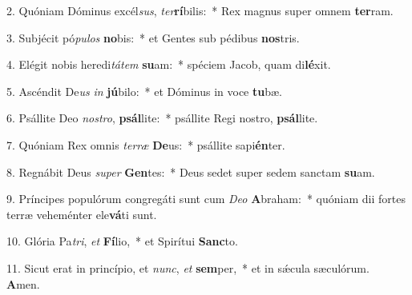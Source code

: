 2. Quóniam Dóminus excél\textit{sus}, \textit{ter}\textbf{rí}bilis:~*  Rex magnus super omnem \textbf{ter}ram.\

3. Subjécit pó\textit{pu}\textit{los} \textbf{no}bis:~*  et Gentes sub pédibus \textbf{nos}tris.\

4. Elégit nobis heredi\textit{tá}\textit{tem} \textbf{su}am:~*  spéciem Jacob, quam di\textbf{lé}xit.\

5. Ascéndit De\textit{us} \textit{in} \textbf{jú}bilo:~*  et Dóminus in voce \textbf{tu}bæ.\

6. Psállite Deo \textit{nos}\textit{tro}, \textbf{psál}lite:~*  psállite Regi nostro, \textbf{psál}lite.\

7. Quóniam Rex omnis \textit{ter}\textit{ræ} \textbf{De}us:~*  psállite sapi\textbf{én}ter.\

8. Regnábit Deus \textit{su}\textit{per} \textbf{Gen}tes:~*  Deus sedet super sedem sanctam \textbf{su}am.\

9. Príncipes populórum congregáti sunt cum \textit{De}\textit{o} \textbf{A}braham:~*  quóniam dii fortes terræ veheménter ele\textbf{vá}ti sunt.\

10. Glória Pa\textit{tri}, \textit{et} \textbf{Fí}lio,~*  et Spirítui \textbf{Sanc}to.\

11. Sicut erat in princípio, et \textit{nunc}, \textit{et} \textbf{sem}per,~*  et in sǽcula sæculórum. \textbf{A}men.\

